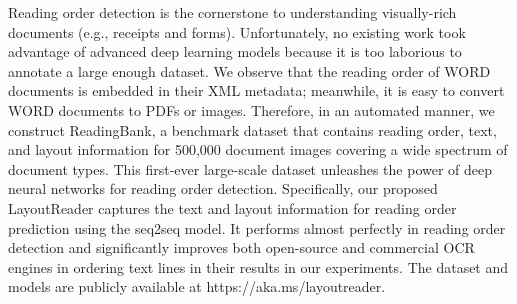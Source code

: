 Reading order detection is the cornerstone to understanding visually-rich documents (e.g., receipts and forms). Unfortunately, no existing work took advantage of advanced deep learning models because it is too laborious to annotate a large enough dataset. We observe that the reading order of WORD documents is embedded in their XML metadata; meanwhile, it is easy to convert WORD documents to PDFs or images. Therefore, in an automated manner, we construct ReadingBank, a benchmark dataset that contains reading order, text, and layout information for 500,000 document images covering a wide spectrum of document types. This first-ever large-scale dataset unleashes the power of deep neural networks for reading order detection. Specifically, our proposed LayoutReader captures the text and layout information for reading order prediction using the seq2seq model. It performs almost perfectly in reading order detection and significantly improves both open-source and commercial OCR engines in ordering text lines in their results in our experiments. The dataset and models are publicly available at https://aka.ms/layoutreader.
